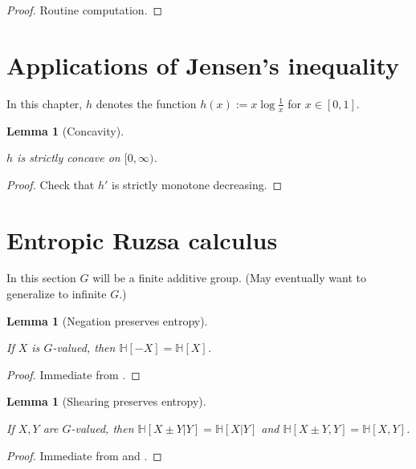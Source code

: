 \documentclass[10pt,a4paper]{article}
\newtheorem{lemma}[theorem]{Lemma}
\newcommand{\lean}[1]{}
\newcommand{\uses}[1]{}
\newcommand{\leanok}{}
\newcommand{\chapter}[1]{\section{#1}}
\newcommand{\bbH}{\mathbb{H}}
\begin{document}
\begin{proof}\leanok Routine computation.
\end{proof}

\chapter{Applications of Jensen's inequality}

In this chapter, $h$ denotes the function $h(x) := x \log \frac{1}{x}$ for $x \in [0,1]$.

\begin{lemma}[Concavity]\label{concave}
  \lean{Real.strictConcaveOn_negMulLog}\leanok
  $h$ is strictly concave on $[0,\infty)$.
\end{lemma}

\begin{proof} \leanok Check that $h'$ is strictly monotone decreasing.
\end{proof}

\chapter{Entropic Ruzsa calculus}

In this section $G$ will be a finite additive group.  (May eventually want to generalize to infinite $G$.)

\begin{lemma}[Negation preserves entropy]\label{neg-ent}
  \lean{ProbabilityTheory.entropy_neg}\leanok
  If $X$ is $G$-valued, then $\bbH[-X]=\bbH[X]$.
\end{lemma}

\begin{proof}
  \uses{relabeled-entropy}\leanok Immediate from .
\end{proof}

\begin{lemma}[Shearing preserves entropy]\label{shear-ent}
  \lean{ProbabilityTheory.condEntropy_add_right, ProbabilityTheory.condEntropy_add_left, ProbabilityTheory.condEntropy_sub_right, ProbabilityTheory.condEntropy_sub_left}\leanok
  If $X,Y$ are $G$-valued, then $\bbH[X \pm Y | Y]=\bbH[X|Y]$ and $\bbH[X \pm Y, Y] = \bbH[X, Y]$.
\end{lemma}

\begin{proof}
  \uses{relabeled-entropy-cond,chain-rule}\leanok Immediate from  and .
\end{proof}
\end{document}
